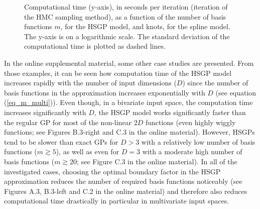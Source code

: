\documentclass[onecolumn,a4paper,11pt]{article}
\begin{document}
\begin{figure}
\centering
{}
\caption{Computational time (y-axis), in seconds per iteration (iteration of the HMC sampling method), as a function of the number of basis functions $m$, for the HSGP model, and knots, for the spline model. The y-axis is on a logarithmic scale. The standard deviation of the computational time is plotted as dashed lines.}
  \label{ch5_fig11_time_exI}
\end{figure}

In the online supplemental material, some other case studies are presented. From those examples, it can be seen how computation time of the HSGP model increases rapidly with the number of input dimensions ($D$) since the number of basis functions in the approximation increases exponentially with $D$ (see equation (\ref{eq_m_multi})). Even though, in a bivariate input space, the computation time increases significantly with $D$, the HSGP model works significantly faster than the regular GP for most of the non-linear $2D$ functions (even highly wiggly functions; see Figures B.3-right and C.3 in the online material). However, HSGPs tend to be slower than exact GPs for $D>3$ with a relatively low number of basis functions ($m \gtrsim 5$), as well as even for $D=3$ with a moderate high number of basis functions ($m \gtrsim 20$; see Figure C.3 in the online material). In all of the investigated cases, choosing the optimal boundary factor in the HSGP approximation reduces the number of required basis functions noticeably (see Figures A.3, B.3-left and C.2 in the online material) and therefore also reduces computational time drastically in particular in multivariate input spaces.
\end{document}
